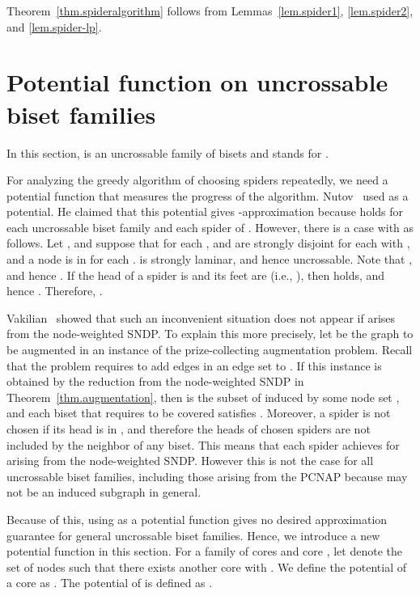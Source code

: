\documentclass[11pt]{article}
\begin{document}
 Theorem~\ref{thm.spideralgorithm} follows from
 Lemmas~\ref{lem.spider1}, \ref{lem.spider2},
 and \ref{lem.spider-lp}.
 


\section{Potential function on uncrossable biset families}
\label{sec.potential}

In this section,  is an uncrossable family of bisets
and  stands for .

For analyzing the greedy algorithm of choosing spiders repeatedly, we need a potential function that
measures the progress of the algorithm. Nutov~\cite{Nutov12uncrossable} used  as a
potential. He claimed that this potential gives -approximation  because
 holds for each uncrossable biset family  and
each spider  of . However, there is a case with  as
follows. Let , and suppose that 
 for each ,  and  are strongly disjoint for
each  with , and a node  is in  for
each .  is strongly laminar, and hence uncrossable. Note that
, and hence . If the head of a
spider  is  and its feet are  (i.e., ), then
 holds, and hence . Therefore,
.

Vakilian~\cite{Vakilian13} showed that such an inconvenient situation does not appear if  arises from the
node-weighted SNDP. To explain this more precisely, let  be the graph to be augmented in an
instance of the prize-collecting augmentation problem. Recall that the problem requires to add edges in an edge set  to . If this instance is obtained by the reduction from the
node-weighted SNDP in Theorem~\ref{thm.augmentation}, then  is the subset of  induced by some node set 
, and each biset  that requires to be covered satisfies .
Moreover, a spider is not chosen if its head is in , 
and therefore the heads of chosen spiders are not included by the neighbor
of any biset. This means that each spider  achieves  for  arising
from the node-weighted SNDP. However this is not the case for all uncrossable biset families, including those arising from 
the PCNAP because  may not be an induced subgraph in general.

Because of this, using  as a potential function gives no desired
approximation guarantee for general uncrossable biset families. Hence, we introduce a new potential function in this section. For a family
 of cores and core ,  let 
denote the set of nodes  such that  there exists another core  with . We define the potential
 of a core  as . The
potential  of  is defined as 
.
\end{document}
